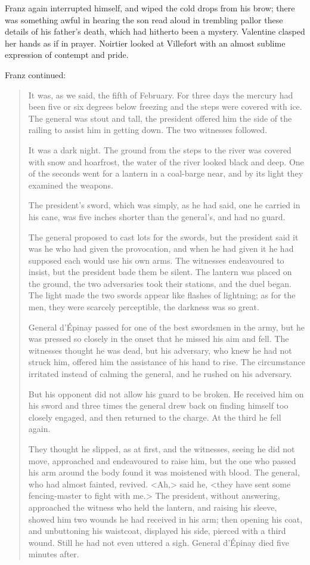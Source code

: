  Franz again interrupted himself, and wiped the cold drops from his brow; there was something awful in hearing the son read aloud in trembling pallor these details of his father's death, which had hitherto been a mystery. Valentine clasped her hands as if in prayer. Noirtier looked at Villefort with an almost sublime expression of contempt and pride. 

 Franz continued: 

\begin{quotation}
It was, as we said, the fifth of February. For three days the mercury had been five or six degrees below freezing and the steps were covered with ice. The general was stout and tall, the president offered him the side of the railing to assist him in getting down. The two witnesses followed. 

It was a dark night. The ground from the steps to the river was covered with snow and hoarfrost, the water of the river looked black and deep. One of the seconds went for a lantern in a coal-barge near, and by its light they examined the weapons. 

The president's sword, which was simply, as he had said, one he carried in his cane, was five inches shorter than the general's, and had no guard. 

The general proposed to cast lots for the swords, but the president said it was he who had given the provocation, and when he had given it he had supposed each would use his own arms. The witnesses endeavoured to insist, but the president bade them be silent. The lantern was placed on the ground, the two adversaries took their stations, and the duel began. The light made the two swords appear like flashes of lightning; as for the men, they were scarcely perceptible, the darkness was so great.  

General d'Épinay passed for one of the best swordsmen in the army, but he was pressed so closely in the onset that he missed his aim and fell. The witnesses thought he was dead, but his adversary, who knew he had not struck him, offered him the assistance of his hand to rise. The circumstance irritated instead of calming the general, and he rushed on his adversary. 

But his opponent did not allow his guard to be broken. He received him on his sword and three times the general drew back on finding himself too closely engaged, and then returned to the charge. At the third he fell again. 

They thought he slipped, as at first, and the witnesses, seeing he did not move, approached and endeavoured to raise him, but the one who passed his arm around the body found it was moistened with blood. The general, who had almost fainted, revived. <Ah,> said he, <they have sent some fencing-master to fight with me.> The president, without answering, approached the witness who held the lantern, and raising his sleeve, showed him two wounds he had received in his arm; then opening his coat, and unbuttoning his waistcoat, displayed his side, pierced with a third wound. Still he had not even uttered a sigh. General d'Épinay died five minutes after.
\end{quotation}

